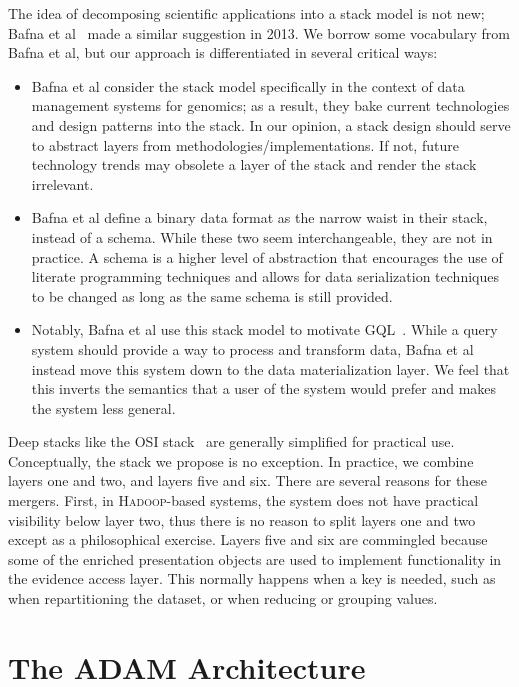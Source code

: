 \documentclass[phd]{ucbthesis}
\begin{document}
The idea of decomposing scientific applications into a stack model is not new; Bafna et al~\cite{bafna13}
made a similar suggestion in 2013. We borrow some vocabulary from Bafna et al, but our approach is
differentiated in several critical ways:

\begin{itemize}
\item Bafna et al consider the stack model specifically in the context of data management systems for
genomics; as a result, they bake current technologies and design patterns into the stack. In our opinion,
a stack design should serve to abstract layers from methodologies/implementations. If not, future
technology trends may obsolete a layer of the stack and render the stack irrelevant.
\item Bafna et al define a binary data format as the narrow waist in their stack, instead of a schema.
While these two seem interchangeable, they are not in practice. A schema is a higher level of abstraction
that encourages the use of literate programming techniques and allows for data serialization techniques
to be changed as long as the same schema is still provided.
\item Notably, Bafna et al use this stack model to motivate GQL~\cite{kozanitis14}. While a query system
should provide a way to process and transform data, Bafna et al instead move this system down to the
data materialization layer. We feel that this inverts the semantics that a user of the system would prefer
and makes the system less general.
\end{itemize}

Deep stacks like the OSI stack~\cite{zimmermann80} are generally simplified for practical use. Conceptually,
the stack we propose is no exception. In practice, we combine layers one and two, and layers five and six.
There are several reasons for these mergers. First, in \textsc{Hadoop}-based systems, the system does not have practical visibility
below layer two, thus there is no reason to split layers one and two except as a philosophical exercise.
Layers five and six are commingled because some of the enriched presentation objects are used to
implement functionality in the evidence access layer. This normally happens when a key is needed, such as
when repartitioning the dataset, or when reducing or grouping values.

\chapter{The \textsc{ADAM} Architecture}
\label{chap:architecture}
\end{document}
